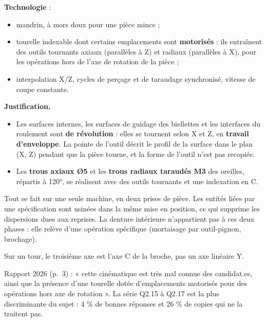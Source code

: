 \documentclass[11pt,a4paper]{article}
\providecommand{\tightlist}{\setlength{\itemsep}{0pt}\setlength{\parskip}{0pt}}
\begin{document}
\textbf{Technologie} :

\begin{itemize}
\tightlist
\item
  mandrin, à mors doux pour une pièce mince ;
\item
  tourelle indexable dont certains emplacements sont \textbf{motorisés} : ils entraînent des outils tournants axiaux (parallèles à Z) et radiaux (parallèles à X), pour les opérations hors de l'axe de rotation de la pièce ;
\item
  interpolation X/Z, cycles de perçage et de taraudage synchronisé, vitesse de coupe constante.
\end{itemize}

\textbf{Justification.}

\begin{itemize}
\tightlist
\item
  Les surfaces internes, les surfaces de guidage des biellettes et les interfaces du roulement sont \textbf{de révolution} : elles se tournent selon X et Z, en \textbf{travail d'enveloppe}. La pointe de l'outil décrit le profil de la surface dans le plan (X, Z) pendant que la pièce tourne, et la forme de l'outil n'est pas recopiée.
\item
  Les \textbf{trous axiaux Ø5} et les \textbf{trous radiaux taraudés M3} des oreilles, répartis à 120°, se réalisent avec des outils tournants et une indexation en C.
\end{itemize}

Tout se fait sur une seule machine, en deux prises de pièce. Les entités liées par une spécification sont usinées dans la même mise en position, ce qui supprime les dispersions dues aux reprises. La denture intérieure n'appartient pas à ces deux phases : elle relève d'une opération spécifique (mortaisage par outil-pignon, brochage).

\begin{piege}

Sur un tour, le troisième axe est l'axe C de la broche, pas un axe linéaire Y.

\end{piege}

\begin{jury}

Rapport 2026 (p.~3) : « cette cinématique est très mal connue des candidat.es, ainsi que la présence d'une tourelle dotée d'emplacements motorisés pour des opérations hors axe de rotation ». La série Q2.15 à Q2.17 est la plus discriminante du sujet : 4 \% de bonnes réponses et 26 \% de copies qui ne la traitent pas.

\end{jury}
\end{document}
